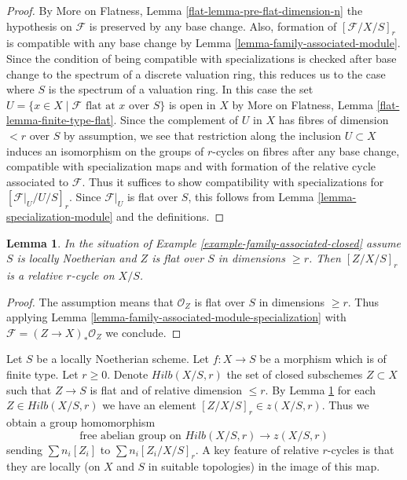 \documentclass{stacks-project}
\theoremstyle{plain}
\newtheorem{lemma}[subsection]{Lemma}
\theoremstyle{definition}
\theoremstyle{remark}
\numberwithin{equation}{subsection}
\begin{document}
\begin{proof}
By More on Flatness, Lemma \ref{flat-lemma-pre-flat-dimension-n}
the hypothesis on $\mathcal{F}$ is preserved by any base change.
Also, formation of $[\mathcal{F}/X/S]_r$ is compatible with any
base change by Lemma \ref{lemma-family-associated-module}.
Since the condition of being compatible with specializations
is checked after base change to the spectrum of a discrete valuation ring,
this reduces us to the case where $S$ is the spectrum of a valuation ring.
In this case the set
$U = \{x \in X \mid \mathcal{F}\text{ flat at }x\text{ over }S\}$
is open in $X$ by
More on Flatness, Lemma \ref{flat-lemma-finite-type-flat}.
Since the complement of $U$ in $X$ has fibres of dimension $< r$ over
$S$ by assumption, we see that restriction along the inclusion
$U \subset X$ induces an isomorphism on the groups of $r$-cycles
on fibres after any base change, compatible with specialization maps
and with formation of the relative cycle associated to $\mathcal{F}$.
Thus it suffices to show compatibility with
specializations for $[\mathcal{F}|_U / U /S]_r$.
Since $\mathcal{F}|_U$ is flat over $S$, this follows from
Lemma \ref{lemma-specialization-module} and the definitions.
\end{proof}

\begin{lemma}
\label{lemma-family-associated-closed-specialization}
In the situation of Example \ref{example-family-associated-closed}
assume $S$ is locally Noetherian and $Z$ is flat over $S$ in dimensions
$\geq r$. Then $[Z/X/S]_r$ is a relative $r$-cycle on $X/S$.
\end{lemma}

\begin{proof}
The assumption means that $\mathcal{O}_Z$ is flat over $S$ in
dimensions $\geq r$. Thus applying
Lemma \ref{lemma-family-associated-module-specialization}
with $\mathcal{F} = (Z \to X)_*\mathcal{O}_Z$ we conclude.
\end{proof}

\noindent
Let $S$ be a locally Noetherian scheme. Let $f : X \to S$ be a morphism
which is of finite type. Let $r \geq 0$. Denote $Hilb(X/S, r)$
the set of closed subschemes $Z \subset X$ such that $Z \to S$ is flat
and of relative dimension $\leq r$. By
Lemma \ref{lemma-family-associated-closed-specialization} for each
$Z \in Hilb(X/S, r)$ we have an element $[Z/X/S]_r \in z(X/S, r)$.
Thus we obtain a group homomorphism
\begin{equation}
\label{equation-cycle-classes}
\text{free abelian group on }Hilb(X/S, r) \longrightarrow z(X/S, r)
\end{equation}
sending $\sum n_i[Z_i]$ to $\sum n_i[Z_i/X/S]_r$.
A key feature of relative $r$-cycles is that they are locally
(on $X$ and $S$ in suitable topologies) in the image of this map.
\end{document}
